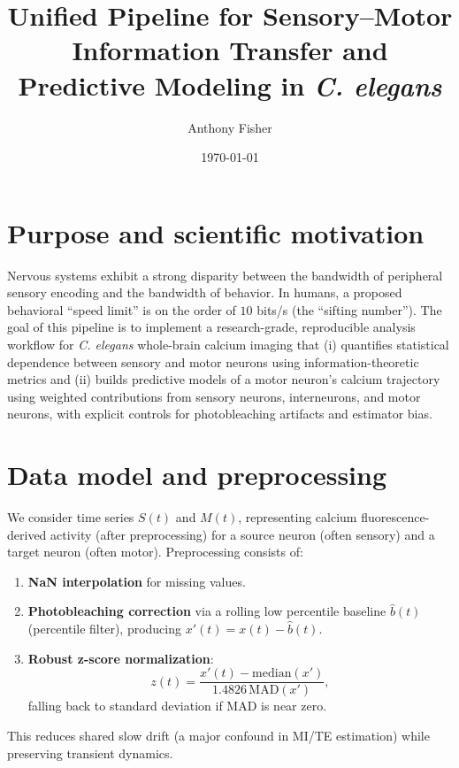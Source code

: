 \documentclass[11pt]{article}
\title{Unified Pipeline for Sensory--Motor Information Transfer and Predictive Modeling in \textit{C. elegans}}
\author{Anthony Fisher}
\date{\today}
\begin{document}
\maketitle

\section{Purpose and scientific motivation}
Nervous systems exhibit a strong disparity between the bandwidth of peripheral sensory encoding and the bandwidth of behavior. In humans, a proposed behavioral ``speed limit'' is on the order of $10$ bits/s (the ``sifting number''). The goal of this pipeline is to implement a research-grade, reproducible analysis workflow for \textit{C. elegans} whole-brain calcium imaging that (i) quantifies statistical dependence between sensory and motor neurons using information-theoretic metrics and (ii) builds predictive models of a motor neuron's calcium trajectory using weighted contributions from sensory neurons, interneurons, and motor neurons, with explicit controls for photobleaching artifacts and estimator bias.

\section{Data model and preprocessing}
We consider time series $S(t)$ and $M(t)$, representing calcium fluorescence-derived activity (after preprocessing) for a source neuron (often sensory) and a target neuron (often motor). Preprocessing consists of:
\begin{enumerate}
  \item \textbf{NaN interpolation} for missing values.
  \item \textbf{Photobleaching correction} via a rolling low percentile baseline $\hat{b}(t)$ (percentile filter), producing $x'(t)=x(t)-\hat{b}(t)$.
  \item \textbf{Robust z-score normalization}:
  \[
  z(t)=\frac{x'(t)-\mathrm{median}(x')}{1.4826\,\mathrm{MAD}(x')},
  \]
  falling back to standard deviation if MAD is near zero.
\end{enumerate}
This reduces shared slow drift (a major confound in MI/TE estimation) while preserving transient dynamics.
\end{document}
